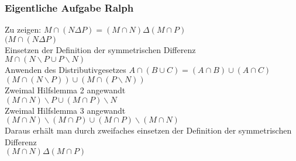\subsubsection*{Eigentliche Aufgabe Ralph}
Zu zeigen: \(M \cap (N \Delta P) = (M \cap N) \Delta (M \cap P) \) \\
\((M \cap (N \Delta P)\) \\
Einsetzen der Definition der symmetrischen Differenz \\
\(M \cap (N \backslash P \cup P \backslash N)\) \\
Anwenden des Distributivgesetzes \(A \cap (B \cup C) = (A \cap B ) \cup (A \cap C)\) \\
\((M \cap (N \backslash P)) \cup (M \cap (P \backslash N)) \) \\
Zweimal Hilfslemma 2 angewandt \\
\((M \cap N) \backslash P \cup (M \cap P) \backslash N \) \\
Zweimal Hilfslemma 3 angewandt \\
\((M \cap N) \backslash (M \cap P) \cup (M \cap P) \backslash (M \cap N) \) \\
Daraus erhält man durch zweifaches einsetzen der Definition der symmetrischen Differenz \\
\((M \cap N) \Delta (M \cap P)\)